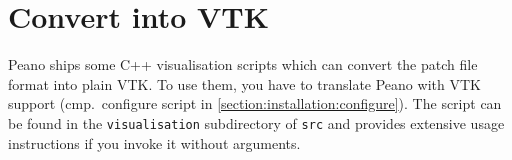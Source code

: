 \section{Convert into VTK}

Peano ships some C++ visualisation scripts which can convert the patch file
format into plain VTK.
To use them, you have to translate Peano with VTK support (cmp.~configure
script in \ref{section:installation:configure}).
The script can be found in the \texttt{visualisation} subdirectory of
\texttt{src} and provides extensive usage instructions if you invoke it without
arguments.

% 
% 
% 
